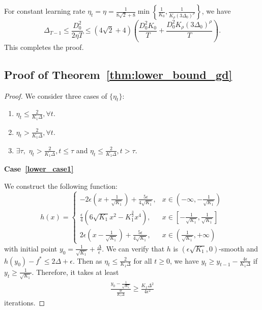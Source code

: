 \documentclass{article}
\newcommand{\Kr}{K_{\rho}}
\newcommand{\paren}[1]{\left( #1 \right)}
\begin{document}
For constant learning rate $\eta_t=\eta=\frac{1}{8\sqrt{2}+8}\min\left\{\frac{1}{K_0},\frac{1}{\Kr \paren{3\Delta_0}^\rho}\right\}$, we have 
$$
\Delta_{T-1}\leq \frac{D_0^2}{2\eta T}\leq \paren{4\sqrt{2}+4}\paren{\frac{D_0^2K_0}{T}+\frac{D_0^2\Kr\paren{3\Delta_0}^\rho}{T}}.
$$
This completes the proof.


\subsection{Proof of Theorem~\ref{thm:lower_bound_gd}}\label{apx:proof_gd_lower_bound}

\begin{proof}

We consider three cases of $\{\eta_t\}$:
\begin{enumerate}
    \item\label{lower_case1} $\eta_t\leq\frac{2}{K_1\Delta},\forall t$.
    \item\label{lower_case2} $\eta_t>\frac{2}{K_1\Delta},\forall t$.
    \item\label{lower_case3} $\exists \tau,$  $\eta_t>\frac{2}{K_1\Delta},t\leq\tau$ and $\eta_t\leq\frac{2}{K_1\Delta},t>\tau$.
\end{enumerate}

\textbf{Case~\ref{lower_case1}}

 We construct the following function:
    \begin{equation}\label{eq:lower_h}
        h(x) = \left\{ \begin{array}{cc}
           -2 \epsilon \left( x+\frac{1}{\sqrt{K_1}} \right) + \frac{5 \epsilon}{4 \sqrt{K_1}}  , & x \in (-\infty, -\frac{1}{\sqrt{K_1}}) \\
            \frac{\epsilon}{4} \left( 6 \sqrt{K_1} x^2 - K_1^{\frac{3}{2}} x^4 \right) , & x\in \left[ -\frac{1}{\sqrt{K_1}}, \frac{1}{\sqrt{K_1}} \right] \\
            2 \epsilon \left( x - \frac{1}{\sqrt{K_1}} \right) + \frac{5 \epsilon}{4 \sqrt{K_1}} , & x \in \left( \frac{1}{\sqrt{K_1}}, +\infty \right)
        \end{array} \right.
    \end{equation}
    with initial point $y_0 = \frac{1}{\sqrt{K_1}} + \frac{\Delta}{\epsilon}$. We can verify that $h$ is $(\epsilon \sqrt{K_1},0)$-smooth and $h(y_0) - f^* \le 2\Delta + \epsilon$. Then as $\eta_t \le \frac{2}{K_1 \Delta}$ for all $t \ge 0$, we have $y_t \ge y_{t-1} - \frac{4\epsilon}{K_1 \Delta}$ if $y_t \ge \frac{1}{\sqrt{K_1}}$. Therefore, it takes at least 
    \begin{align*}
        \frac{y_0 - \frac{1}{\sqrt{K_1}}}{\frac{4\epsilon}{K_1 \Delta}} \ge \frac{K_1 \Delta^2}{4 \epsilon^2}
    \end{align*}
    iterations.


\end{proof}
\end{document}
